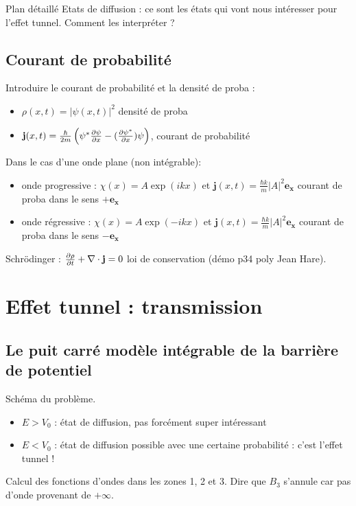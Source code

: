 \begin{reportBlock}{Plan détaillé}
Etats de diffusion : ce sont les états qui vont nous intéresser pour l'effet tunnel. Comment les interpréter ?

\subsection{Courant de probabilité}
Introduire le courant de probabilité et la densité de proba : 
\begin{itemize}
    \item $\rho(x,t)=|\psi(x,t)|^2$ densité de proba
    \item $\mathbf{j}(x,t)=\frac{\hbar}{2m}\left(\psi^*\frac{\partial \psi}{\partial x}-(\frac{\partial \psi^*}{\partial x})\psi\right)$, courant de probabilité
\end{itemize}

Dans le cas d'une onde plane (non intégrable): 
\begin{itemize}
    \item onde progressive : $\chi(x)=A\exp\left(ikx\right)$ et $\mathbf{j}(x,t)=\frac{\hbar k}{m}|A|^2\mathbf{e_x}$ courant de proba dans le sens $+\mathbf{e_x}$
    \item onde régressive : $\chi(x)=A\exp\left(-ikx\right)$ et $\mathbf{j}(x,t)=\frac{\hbar k}{m}|A|^2\mathbf{e_x}$ courant de proba dans le sens $-\mathbf{e_x}$
\end{itemize}
Schrödinger : $\frac{\partial \rho}{\partial t}+\nabla\cdot\mathbf{j}=0$ loi de conservation (démo p34 poly Jean Hare).

\section{Effet tunnel : transmission}

\subsection{Le puit carré modèle intégrable de la barrière de potentiel}
Schéma du problème.\\
\begin{itemize}
    \item $E>V_0$ : état de diffusion, pas forcément super intéressant
    \item $E<V_0$ : état de diffusion possible avec une certaine probabilité : c'est l'effet tunnel !
\end{itemize}
Calcul des fonctions d'ondes dans les zones 1, 2 et 3. Dire que $B_3$ s'annule car pas d'onde provenant de $+\infty$.\\


\end{reportBlock}
